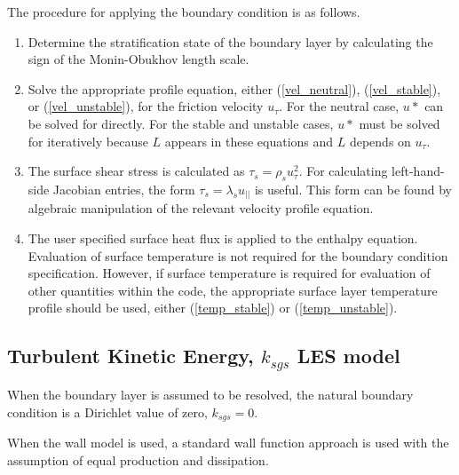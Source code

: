The procedure for applying the boundary condition is as follows.
\begin{enumerate}
\item Determine the stratification state of the boundary layer by
  calculating the sign of the Monin-Obukhov length scale.
\item Solve the appropriate profile equation, either
  (\ref{vel_neutral}), (\ref{vel_stable}), or (\ref{vel_unstable}),
  for the friction velocity $u_\tau$.  For the neutral case, $u*$ can be
  solved for directly.  For the stable and unstable cases, $u*$ must
  be solved for iteratively because $L$ appears in these equations and
  $L$ depends on $u_\tau$.
\item The surface shear stress is calculated as $\tau_s = \rho_s u_\tau^2$.
  For calculating left-hand-side Jacobian entries, the form $\tau_s =
  \lambda_s u_{||}$ is useful. This form can be found by algebraic
  manipulation of the relevant velocity profile equation.
\item The user specified surface heat flux is applied to the enthalpy
  equation.  Evaluation of surface temperature is not required for
  the boundary condition specification.  However, if surface
  temperature is required for evaluation of other quantities within
  the code, the appropriate surface layer temperature profile should
  be used, either (\ref{temp_stable}) or (\ref{temp_unstable}).
\end{enumerate}

\subsection{Turbulent Kinetic Energy, $k_{sgs}$ LES model}
When the boundary layer is assumed to be resolved, the natural boundary condition is a Dirichlet value of zero, 
$k_{sgs} = 0$. 

When the wall model is used, a standard wall function approach is used with the assumption of equal production and
dissipation.

